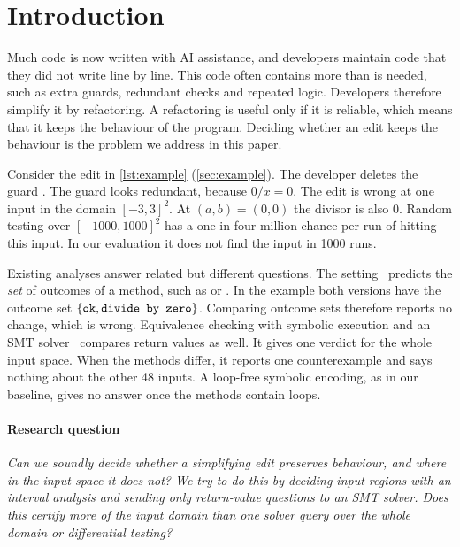 \section{Introduction}
\label{sec:introduction}

Much code is now written with AI assistance, and developers maintain code that they did not
write line by line. This code often contains more than is needed, such as extra guards,
redundant checks and repeated logic. Developers therefore simplify it by refactoring. A
refactoring is useful only if it is reliable, which means that it keeps the behaviour of the
program. Deciding whether an edit keeps the behaviour is the problem we address in this paper.

Consider the edit in \cref{lst:example} (\cref{sec:example}). The developer deletes the guard
. The guard looks redundant, because $0 / x = 0$. The edit is wrong
at one input in the domain $[-3,3]^2$. At $(a,b)=(0,0)$ the divisor is also $0$. Random testing
over $[-1000,1000]^2$ has a one-in-four-million chance per run of hitting this input. In our
evaluation it does not find the input in 1000 runs.

Existing analyses answer related but different questions. The \jpamb{}
setting~\citep{kalhauge2026jpamb} predicts the \emph{set} of outcomes of a method, such as
 or . In the example both versions have the outcome set
$\left\{\texttt{ok}, \texttt{divide by zero}\right\}$. Comparing outcome sets therefore reports no change, which is wrong.
Equivalence checking with symbolic execution and an SMT
solver~\citep{godlin2009regression,lahiri2012symdiff} compares return values as well. It gives
one verdict for the whole input space. When the methods differ, it reports one counterexample
and says nothing about the other 48 inputs. A loop-free symbolic encoding, as in our baseline,
gives no answer once the methods contain loops.

\paragraph{Research question}
\emph{Can we soundly decide whether a simplifying edit preserves behaviour, and where in the
input space it does not? We try to do this by deciding input regions with an interval analysis
and sending only return-value questions to an SMT solver. Does this certify more of the input
domain than one solver query over the whole domain or differential testing?}


